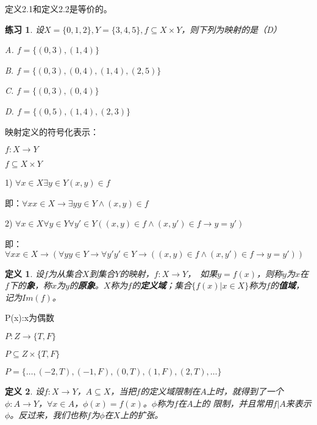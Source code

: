 \documentclass{book}[oneside]
\newtheorem{Def}{定义}[chapter]
\newtheorem{Exercise}{练习}[chapter]
\begin{document}
\begin{CJK*}{UTF8}{gbsn}
  定义2.1和定义2.2是等价的。

    \begin{Exercise}
    设$X=\{0,1,2\}, Y= \{3,4,5\}, f\subseteq X \times Y$，则下列为映射的是（D）

    A. $f = \{(0,3), (1,4)\}$

    B. $f = \{(0,3), (0,4), (1,4),(2,5)\}$

    C. $f = \{(0,3), (0,4)\}$

    D. $f = \{(0,5), (1,4), (2,3)\}$
  \end{Exercise}

   映射定义的符号化表示：

  $f:X\to Y$
  
  $f\subseteq X\times Y$

  1) $\forall x \in X \exists y\in Y (x,y) \in f$

  即：$\forall x x \in X \to \exists y y\in Y \land (x,y) \in f$

  2) $\forall x \in X \forall y \in Y \forall y'\in Y ((x,y) \in f \land (x, y') \in f \to y = y')$

  即：$\forall x x \in X \to (\forall y y \in Y \to \forall y' y' \in Y \to ((x,y) \in f \land (x, y') \in f \to y = y'))$
    
 
  \begin{Def}
    设$f$为从集合$X$到集合$Y$的映射，$f:X\to Y$，　如果$y = f(x)$，则称$y$为$x$在$f$下的{\bfseries 象}，称$x$为$y$的{\bfseries 原象}。$X$称为$f$的{\bfseries 定义域}；集合$\{f(x) | x \in X\}$称为$f$的{\bfseries 值域}，记为$Im(f)$。
  \end{Def}

  P(x):x为偶数

$P:Z\to \{T,F\}$

$P\subseteq Z \times \{T,F\}$

$P=\{\ldots, (-2, T), (-1, F), (0, T), (1,F), (2,T), \ldots\}$


  \begin{Def}
    设$f:X\to Y$，$A\subseteq X$，当把$f$的定义域限制在$A$上时，就得到了一个
    $\phi: A\to Y$，$\forall x \in A$，$\phi(x) = f(x)$。$\phi$称为$f$在$A$上的
    限制，并且常用$f|A$来表示$\phi$。反过来，我们也称$f$为$\phi$在$X$上的扩张。
  \end{Def}


\end{CJK*}
\end{document}
